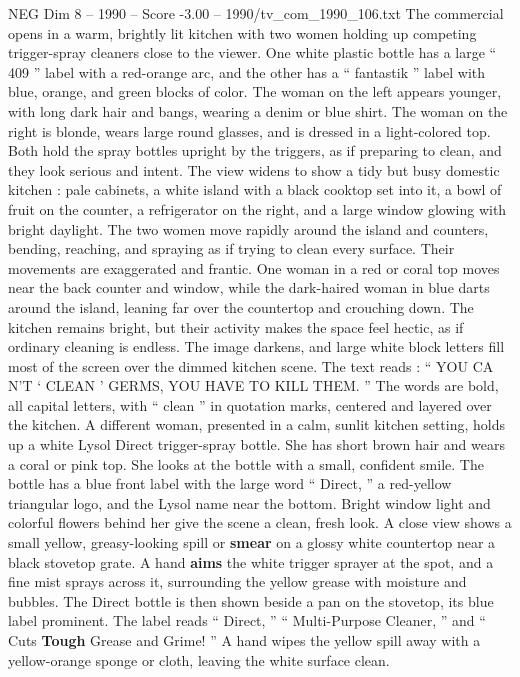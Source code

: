 \begin{textsample}{NEG Dim 8 – 1990 – Score -3.00 – 1990/tv\_com\_1990\_106.txt}  \label{ex:f8_neg_034}
The commercial opens in a warm, brightly lit kitchen with two women holding up competing trigger-spray cleaners close to the viewer.
One white plastic bottle has a large “ 409 ” label with a red-orange arc, and the other has a “ fantastik ” label with blue, orange, and green blocks of color.
The woman on the left appears younger, with long dark hair and bangs, wearing a denim or blue shirt.
The woman on the right is blonde, wears large round glasses, and is dressed in a light-colored top.
Both hold the spray bottles upright by the triggers, as if preparing to clean, and they look serious and intent.
The view widens to show a tidy but busy domestic kitchen : pale cabinets, a white island with a black cooktop set into it, a bowl of fruit on the counter, a refrigerator on the right, and a large window glowing with bright daylight.
The two women move rapidly around the island and counters, bending, reaching, and spraying as if trying to clean every surface.
Their movements are exaggerated and frantic.
One woman in a red or coral top moves near the back counter and window, while the dark-haired woman in blue darts around the island, leaning far over the countertop and crouching down.
The kitchen remains bright, but their activity makes the space feel hectic, as if ordinary cleaning is endless.
The image darkens, and large white block letters fill most of the screen over the dimmed kitchen scene.
The text reads : “ YOU CA N’T ‘ CLEAN ’ GERMS, YOU HAVE TO KILL THEM. ” The words are bold, all capital letters, with “ clean ” in quotation marks, centered and layered over the kitchen.
A different woman, presented in a calm, sunlit kitchen setting, holds up a white Lysol Direct trigger-spray bottle.
She has short brown hair and wears a coral or pink top.
She looks at the bottle with a small, confident smile.
The bottle has a blue front label with the large word “ Direct, ” a red-yellow triangular logo, and the Lysol name near the bottom.
Bright window light and colorful flowers behind her give the scene a clean, fresh look.
A close view shows a small yellow, greasy-looking spill or \textbf{smear} on a glossy white countertop near a black stovetop grate.
A hand \textbf{aims} the white trigger sprayer at the spot, and a fine mist sprays across it, surrounding the yellow grease with moisture and bubbles.
The Direct bottle is then shown beside a pan on the stovetop, its blue label prominent.
The label reads “ Direct, ” “ Multi-Purpose Cleaner, ” and “ Cuts \textbf{Tough} Grease and Grime! ” A hand wipes the yellow spill away with a yellow-orange sponge or cloth, leaving the white surface clean.

\end{textsample}
